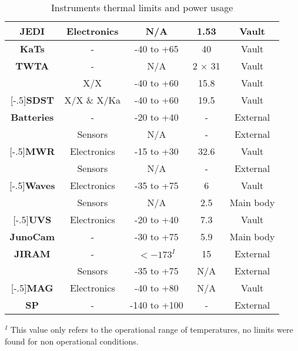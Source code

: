 \begin{table}[H]
\begin{tabular}{|c||c|c|c|c|}
        \multirow{-2}{*}[-.5\arrayrulewidth]{\textbf{JEDI}} &  Electronics & N/A & 1.53 & Vault \\
        \hline
        \textbf{KaTs} & - & -40 to +65 & 40 & Vault \\
        \hline
        \textbf{TWTA} & - & N/A & 2 $\times$ 31 & Vault \\
        \hline
        & X/X & -40 to +60 & 15.8 & Vault \\
        \hhline{|~|-|-|-|-|}
        \multirow{-2}{*}[-.5\arrayrulewidth]{\textbf{SDST}} & X/X \& X/Ka & -40 to +60 & 19.5 & Vault \\
        \hline
        \textbf{Batteries} & - & -20 to +40 & - & External \\
        \hline
        & Sensors & N/A & - & External \\
        \hhline{|~|-|-|-|-|}
        \multirow{-2}{*}[-.5\arrayrulewidth]{\textbf{MWR}} & Electronics & -15 to +30 & 32.6 & Vault \\
        \hline
        & Sensors & N/A & - & External \\
        \hhline{|~|-|-|-|-|}
        \multirow{-2}{*}[-.5\arrayrulewidth]{\textbf{Waves}} & Electronics & -35 to +75 & 6 & Vault \\
        \hline
        & Sensors & N/A & 2.5 & Main body \\
        \hhline{|~|-|-|-|-|}
        \multirow{-2}{*}[-.5\arrayrulewidth]{\textbf{UVS}} & Electronics & -20 to +40 & 7.3 & Vault \\
        \hline
        \textbf{JunoCam} & - & -30 to +75 & 5.9 & Main body \\
        \hline
        \textbf{JIRAM} & - & $<-173^I$ & 15 & External \\
        \hline
        & Sensors & -35 to +75 & N/A & External \\
        \hhline{|~|-|-|-|-|}
        \multirow{-2}{*}[-.5\arrayrulewidth]{\textbf{MAG}} & Electronics & -40 to +80 & N/A & Vault \\
        \hline
        \textbf{SP} & - & -140 to +100 & - & External \\
        \hline
    \end{tabular}
    \caption{Instruments thermal limits and power usage}
    \label{table:thermal_limits}
\end{table}

$^I$ This value only refers to the operational range of temperatures, no limits were found for non operational conditions.




